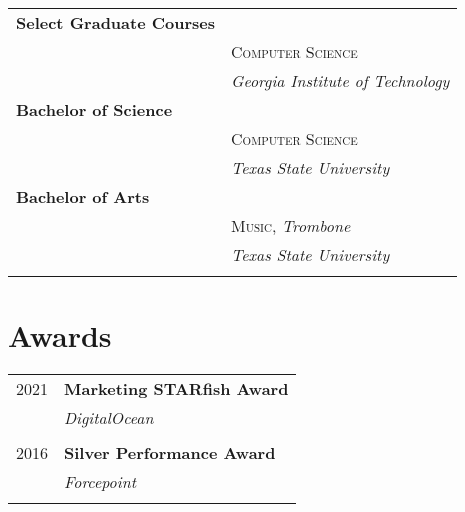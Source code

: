 \documentclass[10pt]{article} %
\begin{document}
\begin{minipage}[t]{0.44\textwidth}
\begin{tabular}{ll} %

\textbf{Select Graduate Courses} \\ 
& \textsc{Computer Science} \\ 
& \textit{Georgia Institute of Technology}\\


\textbf{Bachelor of Science} \\ 
& \textsc{Computer Science} \\ 
& \textit{Texas State University}\\

     

\textbf{Bachelor of Arts} \\ 
& \textsc{Music}, \textit{Trombone}\\ 
& \textit{Texas State University}\\ \\

\end{tabular}



\section{Awards} 

\begin{tabular}{rl}

2021     & \textbf{Marketing STARfish Award}\\
& \textit{DigitalOcean} \\\\

2016     & \textbf{Silver Performance Award}\\
& \textit{Forcepoint}\\ \\


\end{tabular}
\end{minipage}
\end{document}

